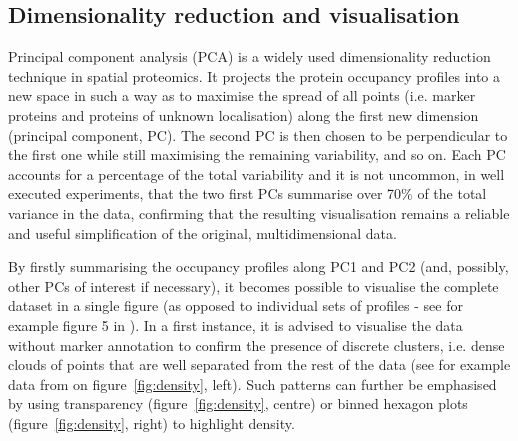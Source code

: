 \documentclass[12pt]{article}\usepackage[]{graphicx}\usepackage[]{color}
\begin{document}
\subsection{Dimensionality reduction and visualisation}\label{sec:vis}

Principal component analysis (PCA) is a widely used dimensionality
reduction technique in spatial proteomics. It projects the protein
occupancy profiles into a new space in such a way as to maximise the
spread of all points (i.e. marker proteins and proteins of unknown
localisation) along the first new dimension (principal component,
PC). The second PC is then chosen to be perpendicular to the first one
while still maximising the remaining variability, and so on. Each PC
accounts for a percentage of the total variability and it is not
uncommon, in well executed experiments, that the two first PCs
summarise over 70\% of the total variance in the data, confirming that
the resulting visualisation remains a reliable and useful
simplification of the original, multidimensional data.

By firstly summarising the occupancy profiles along PC1 and PC2 (and,
possibly, other PCs of interest if necessary), it becomes possible to
visualise the complete dataset in a single figure (as opposed to
individual sets of profiles - see for example figure 5 in
\citet{Gatto:2010}). In a first instance, it is advised to visualise
the data without marker annotation to confirm the presence of discrete
clusters, i.e. dense clouds of points that are well separated from the
rest of the data (see for example data from \citet{Christoforou:2016}
on figure~\ref{fig:density}, left). Such patterns can further be
emphasised by using transparency (figure~\ref{fig:density}, centre) or
binned hexagon plots (figure~\ref{fig:density}, right) to highlight
density.
\end{document}

